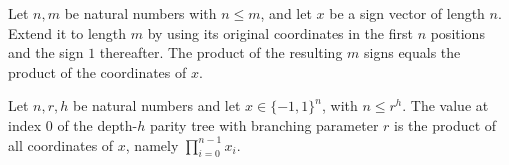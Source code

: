 \begin{theorem}
\label{FABL.prod_paddedParityInput_eq_prod}
\leanok
{}
Let $n,m$ be natural numbers with $n\le m$, and let $x$ be a sign vector of length $n$.
Extend it to length $m$ by using its original coordinates in the first $n$ positions and
the sign $1$ thereafter. The product of the resulting $m$ signs equals the product of
the coordinates of $x$.
\end{theorem}

\begin{theorem}
\label{FABL.parityTreeValue_eq_parityFunction}
\leanok
{}
Let $n,r,h$ be natural numbers and let $x\in\{-1,1\}^n$, with $n\le r^h$. The value at
index $0$ of the depth-$h$ parity tree with branching parameter $r$ is the product of
all coordinates of $x$, namely $\prod_{i=0}^{n-1}x_i$.
\end{theorem}

